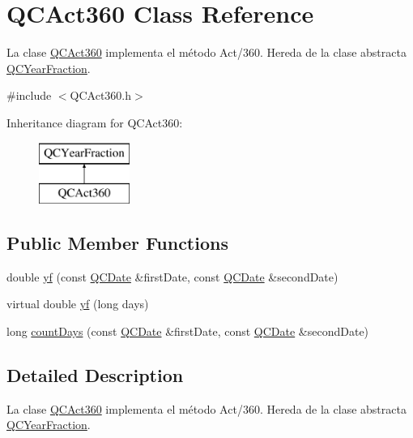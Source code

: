 \hypertarget{class_q_c_act360}{\section{Q\+C\+Act360 Class Reference}
\label{class_q_c_act360}
}


La clase \hyperlink{class_q_c_act360}{Q\+C\+Act360} implementa el método Act/360. Hereda de la clase abstracta \hyperlink{class_q_c_year_fraction}{Q\+C\+Year\+Fraction}.  




{\ttfamily \#include $<$Q\+C\+Act360.\+h$>$}

Inheritance diagram for Q\+C\+Act360\+:\begin{figure}[H]
\begin{center}
\leavevmode
\includegraphics[height=2.000000cm]{class_q_c_act360}
\end{center}
\end{figure}
\subsection*{Public Member Functions}
\begin{DoxyCompactItemize}
\item 
double \hyperlink{class_q_c_act360_a63b8c11fddd7949ad0cfa2280ca229e9}{yf} (const \hyperlink{class_q_c_date}{Q\+C\+Date} \&first\+Date, const \hyperlink{class_q_c_date}{Q\+C\+Date} \&second\+Date)
\item 
virtual double \hyperlink{class_q_c_act360_a103e41364093ca0d0157d5782b88dec4}{yf} (long days)
\item 
long \hyperlink{class_q_c_act360_a415e4b5c9d5b5e5b1b9a3fd52795016b}{count\+Days} (const \hyperlink{class_q_c_date}{Q\+C\+Date} \&first\+Date, const \hyperlink{class_q_c_date}{Q\+C\+Date} \&second\+Date)
\end{DoxyCompactItemize}


\subsection{Detailed Description}
La clase \hyperlink{class_q_c_act360}{Q\+C\+Act360} implementa el método Act/360. Hereda de la clase abstracta \hyperlink{class_q_c_year_fraction}{Q\+C\+Year\+Fraction}. 

